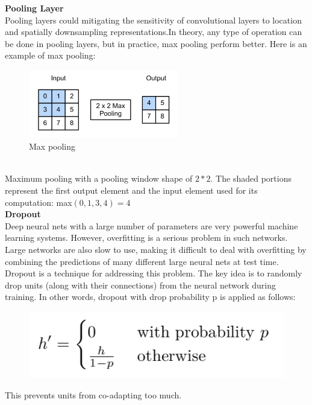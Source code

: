 \documentclass{article}
\begin{document}
\textbf{Pooling Layer}\\[4]
Pooling layers could mitigating the sensitivity of convolutional layers to location and spatially downsampling representations.In theory, any type of operation can be done in pooling layers, but in practice, max pooling perform better. Here is an example of max pooling:\\
\begin{figure}[htbp]
\centering
\includegraphics[width=6.5cm]{max-pooling.png}
\caption{Max pooling}
\end{figure}\\
Maximum pooling with a pooling window shape of $2*2$. The shaded portions represent the first output element and the input element used for its computation: max$(0, 1, 3, 4) = 4$\\

\textbf{Dropout}\\[4]
Deep neural nets with a large number of parameters are very powerful machine learning systems. However, overfitting is a serious problem in such networks. Large networks are also slow to use, making it difficult to deal with overfitting by combining the predictions of many different large neural nets at test time. Dropout is a technique for addressing this problem. The key idea is to randomly drop units (along with their connections) from the neural network during training. In other words, dropout with drop probability p is applied as follows:
\begin{figure}[htbp]
\centering
\includegraphics[scale = 0.5]{function.png}
\end{figure}


This prevents units from co-adapting too much. 
\end{document}
